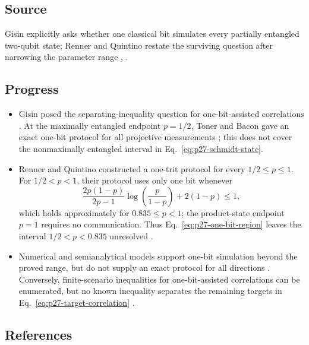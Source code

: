 \subsection*{Source}

Gisin explicitly asks whether one classical bit simulates every partially
entangled two-qubit state; Renner and Quintino restate the surviving question
after narrowing the parameter range
,
.

\subsection*{Progress}

\begin{itemize}
  \item Gisin posed the separating-inequality question for one-bit-assisted
  correlations .  At the maximally entangled
  endpoint $p=1/2$, Toner and Bacon gave an exact one-bit protocol for all
  projective measurements ; this does
  not cover the nonmaximally entangled interval in
  Eq.~\eqref{eq:p27-schmidt-state}.

  \item Renner and Quintino constructed a one-trit protocol for every
  $1/2\leq p\leq1$.  For $1/2<p<1$, their protocol uses only one bit whenever
  \begin{equation}
    \frac{2p(1-p)}{2p-1}\log\!\left(\frac{p}{1-p}\right)+2(1-p)\leq1,
    \label{eq:p27-one-bit-region}
  \end{equation}
  which holds approximately for $0.835\leq p<1$; the product-state endpoint
  $p=1$ requires no communication.  Thus
  Eq.~\eqref{eq:p27-one-bit-region} leaves the interval
  $1/2<p<0.835$ unresolved .

  \item Numerical and semianalytical models support one-bit simulation beyond
  the proved range, but do not supply an exact protocol for all directions
  .  Conversely, finite-scenario
  inequalities for one-bit-assisted correlations can be enumerated, but no
  known inequality separates the remaining targets in
  Eq.~\eqref{eq:p27-target-correlation}
  .
\end{itemize}

\subsection*{References}

